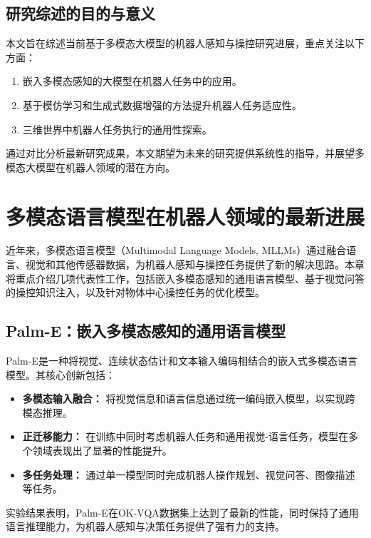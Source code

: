 \documentclass[a4paper]{article}
\begin{document}
\subsection{研究综述的目的与意义}
本文旨在综述当前基于多模态大模型的机器人感知与操控研究进展，重点关注以下方面：
\begin{enumerate}
    \item 嵌入多模态感知的大模型在机器人任务中的应用。
    \item 基于模仿学习和生成式数据增强的方法提升机器人任务适应性。
    \item 三维世界中机器人任务执行的通用性探索。
\end{enumerate}
通过对比分析最新研究成果，本文期望为未来的研究提供系统性的指导，并展望多模态大模型在机器人领域的潜在方向。


\section{多模态语言模型在机器人领域的最新进展}

近年来，多模态语言模型（Multimodal Language Models, MLLMs）通过融合语言、视觉和其他传感器数据，为机器人感知与操控任务提供了新的解决思路。本章将重点介绍几项代表性工作，包括嵌入多模态感知的通用语言模型、基于视觉问答的操控知识注入，以及针对物体中心操控任务的优化模型。

\subsection{Palm-E：嵌入多模态感知的通用语言模型}
Palm-E是一种将视觉、连续状态估计和文本输入编码相结合的嵌入式多模态语言模型。其核心创新包括：
\begin{itemize}
    \item \textbf{多模态输入融合：} 将视觉信息和语言信息通过统一编码嵌入模型，以实现跨模态推理。
    \item \textbf{正迁移能力：} 在训练中同时考虑机器人任务和通用视觉-语言任务，模型在多个领域表现出了显著的性能提升。
    \item \textbf{多任务处理：} 通过单一模型同时完成机器人操作规划、视觉问答、图像描述等任务。
\end{itemize}
实验结果表明，Palm-E在OK-VQA数据集上达到了最新的性能，同时保持了通用语言推理能力，为机器人感知与决策任务提供了强有力的支持。
\end{document}

